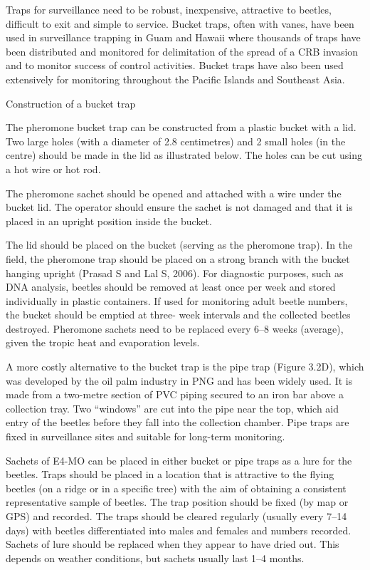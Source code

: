 \documentclass[twocolumn,letterpaper]{scrartcl}
\begin{document}
Traps for surveillance need to be robust, inexpensive, attractive to beetles, difficult to exit and simple to service. 
Bucket traps, often with vanes, have been used in surveillance trapping in Guam and Hawaii where thousands 
of traps have been distributed and monitored for delimitation of the spread of a CRB invasion and to monitor 
success of control activities. Bucket traps have also been used extensively for monitoring throughout the Pacific 
Islands and Southeast Asia. 

Construction of a bucket trap

The pheromone bucket trap can be constructed from a plastic bucket with a lid. Two large holes (with a diameter 
of 2.8 centimetres) and 2 small holes (in the centre) should be made in the lid as illustrated below. The holes can 
be cut using a hot wire or hot rod. 

The pheromone sachet should be opened and attached with a wire under the bucket lid. The operator should 
ensure the sachet is not damaged and that it is placed in an upright position inside the bucket. 

The lid should be placed on the bucket (serving as the pheromone trap). In the field, the pheromone trap 
should be placed on a strong branch with the bucket hanging upright (Prasad S and Lal S, 2006). For diagnostic 
purposes, such as DNA analysis, beetles should be removed at least once per week and stored individually 
in plastic containers. If used for monitoring adult beetle numbers, the bucket should be emptied at three-
week intervals and the collected beetles destroyed. Pheromone sachets need to be replaced every 6–8 weeks 
(average), given the tropic heat and evaporation levels.

A more costly alternative to the bucket trap is the pipe trap (Figure 3.2D), which was developed by the oil palm 
industry in PNG and has been widely used. It is made from a two-metre section of PVC piping secured to an 
iron bar above a collection tray. Two “windows” are cut into the pipe near the top, which aid entry of the beetles 
before they fall into the collection chamber. Pipe traps are fixed in surveillance sites and suitable for long-term 
monitoring. 

Sachets of E4-MO can be placed in either bucket or pipe traps as a lure for the beetles. Traps should be placed 
in a location that is attractive to the flying beetles (on a ridge or in a specific tree) with the aim of obtaining a 
consistent representative sample of beetles. The trap position should be fixed (by map or GPS) and recorded. 
The  traps  should  be  cleared  regularly  (usually  every  7–14  days)  with  beetles  differentiated  into  males  and 
females and numbers recorded. Sachets of lure should be replaced when they appear to have dried out. This 
depends on weather conditions, but sachets usually last 1–4 months. 
\end{document}
